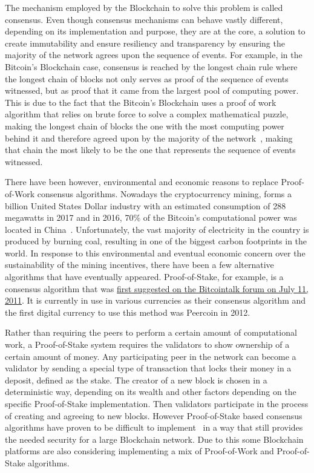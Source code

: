 The mechanism employed by the Blockchain to solve this problem is called
consensus.  Even though consensus mechanisms can behave vastly different,
depending on its implementation and purpose, they are at the core, a solution
to create immutability and ensure resiliency and transparency by ensuring the
majority of the network agrees upon the sequence of events. For example, in the
Bitcoin's Blockchain case, consensus is reached by the longest chain rule where
the longest chain of blocks not only serves as proof of the sequence of events
witnessed, but as proof that it came from the largest pool of computing power.
This is due to the fact that the Bitcoin's Blockchain uses a proof of work
algorithm that relies on brute force to solve a complex mathematical puzzle,
making the longest chain of blocks the one with the most computing power behind
it and therefore agreed upon by the majority of the
network~\cite{Baars2016,Wood2017}, making that chain the most likely to be the
one that represents the sequence of events witnessed.

There have been however, environmental and economic reasons to replace
Proof-of-Work consensus algorithms. Nowadays the cryptocurrency mining, forms a
billion United States Dollar industry with an estimated consumption of 288
megawatts in 2017 and in 2016, 70\% of the Bitcoin's computational power was
located in China~\cite{BitcoinMining2017}.  Unfortunately, the vast majority of
electricity in the country is produced by burning coal, resulting in one of the
biggest carbon footprints in the world. In response to this environmental and
eventual economic concern over the sustainability of the mining incentives,
there have been a few alternative algorithms that have eventually appeared.
Proof-of-Stake, for example, is a consensus algorithm that was
\href{https://bitcointalk.org/index.php?topic=27787.0}{first suggested on the
Bitcointalk forum on July 11, 2011}. It is currently in use in various
currencies as their consensus algorithm and the first digital currency to use
this method was Peercoin in 2012. 

Rather than requiring the peers to perform a certain amount of computational
work, a Proof-of-Stake system requires the validators to show ownership of a
certain amount of money. Any participating peer in the network can become a
validator by sending a special type of transaction that locks their money in a
deposit, defined as the stake. The creator of a new block is chosen in a
deterministic way, depending on its wealth and other factors depending on the
specific Proof-of-Stake implementation. Then validators participate in the
process of creating and agreeing to new blocks. However Proof-of-Stake based
consensus algorithms have proven to be difficult to
implement~\cite{EthereumSlasher2014} in a way that still provides the needed
security for a large Blockchain network. Due to this some Blockchain platforms
are also considering implementing a mix of Proof-of-Work and Proof-of-Stake
algorithms.

